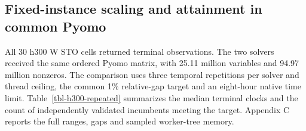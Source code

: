 \documentclass[
  english,
  11pt,
  a4paper,
  authoryear,
  preprint]{elsarticle}
\begin{document}
\subsection{Fixed-instance scaling and attainment in common
Pyomo}\label{fixed-instance-scaling-and-attainment-in-common-pyomo}

All 30 h300 W STO cells returned terminal observations. The two solvers
received the same ordered Pyomo matrix, with 25.11 million variables and
94.97 million nonzeros. The comparison uses three temporal repetitions
per solver and thread ceiling, the common 1\% relative-gap target and an
eight-hour native time limit. Table~\ref{tbl-h300-repeated} summarizes
the median terminal clocks and the count of independently validated
incumbents meeting the target. Appendix C reports the full ranges, gaps
and sampled worker-tree memory.
\end{document}

